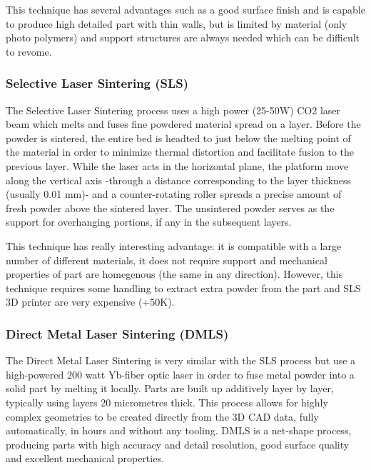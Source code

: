 This technique has several advantages such as a good surface finish and is capable to produce high detailed part with thin walls, but is limited by material (only photo polymers) and support structures are always needed which can be difficult to revome.

\subsubsection{Selective Laser Sintering (SLS)} %
The Selective Laser Sintering process uses a high power (25-50W) CO2 laser beam which melts and fuses fine powdered material spread on a layer. Before the powder is sintered, the entire bed is headted to just below the melting point of the material in order to minimize thermal distortion and facilitate fusion to the previous layer.
While the laser acts in the horizontal plane, the platform move along the vertical axis -through a distance corresponding to the layer thickness (usually 0.01 mm)- and a counter-rotating roller spreads a precise amount of fresh powder above the sintered layer. The unsintered powder serves as the support for overhanging portions, if any in the subsequent layers.

\begin{figure}[h]
    \centering
        \hfil
        \hfil
    \caption{}
    \label{fig:SLS_technique}
\end{figure}

This technique has really interesting advantage: it is compatible with a large number of different materials, it does not require support and mechanical properties of part are homegenous (the same in any direction). However, this technique requires some handling to extract extra powder from the part and SLS 3D printer are very expensive (+50K).


\subsubsection{Direct Metal Laser Sintering (DMLS)} %

The Direct Metal Laser Sintering is very similar with the SLS process but use a high-powered 200 watt Yb-fiber optic laser in order to fuse metal powder into a solid part by melting it locally. Parts are built up additively layer by layer, typically using layers 20 micrometres thick. This process allows for highly complex geometries to be created directly from the 3D CAD data, fully automatically, in hours and without any tooling. DMLS is a net-shape process, producing parts with high accuracy and detail resolution, good surface quality and excellent mechanical properties.


